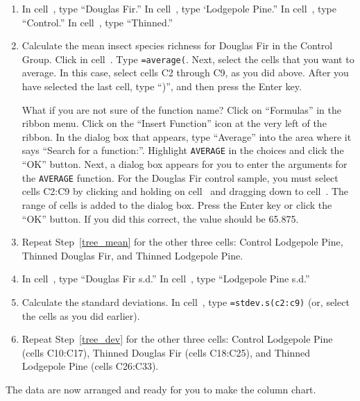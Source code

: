 \documentclass[12pt, hidelinks]{exam}
\newcommand*\xcell[1]{cell~\liningnum{#1}}
\begin{document}
\begin{questions}
\begin{enumerate}
	\item In \xcell{F3}, type “Douglas Fir.” In \xcell{G3}, type ‘Lodgepole Pine.” In \xcell{E4}, type “Control.” In \xcell{E5}, type “Thinned.” 

	\item \label{tree_mean} Calculate the mean insect species richness for Douglas Fir in the Control Group. Click in \xcell{F4}. Type \texttt{=average(}. Next, select the cells that you want to average. In this case, select cells {\liningnum C2} through {\liningnum C9}, as you did above. After you have selected the last cell, type “)”, and then press the Enter key. 

	What if you are not sure of the function name? Click on “Formulas” in the ribbon menu. Click on the “Insert Function” icon at the very left of the ribbon. In the dialog box that appears, type “Average” into the area where it says “Search for a function:”. Highlight \texttt{AVERAGE} in the choices and click the “OK” button. Next, a dialog box appears for you to enter the arguments for the \texttt{AVERAGE} function. For the Douglas Fir control sample, you must select cells C2:C9 by clicking and holding on \xcell{C2} and dragging down to \xcell{C9}. The range of cells is added to the dialog box. Press the Enter key or click the “OK” button. If you did this correct, the value should be 65.875.

	\item Repeat Step~\ref{tree_mean} for the other three cells: Control Lodgepole Pine, Thinned Douglas Fir, and Thinned Lodgepole Pine. 
	
	\item \label{tree_dev} In \xcell{I3}, type ``Douglas Fir s.d.'' In \xcell{J3}, type ``Lodgepole Pine s.d.''
	
	\item Calculate the standard deviations. In \xcell{I4}, type \texttt{=stdev.s(c2:c9)} (or, select the cells as you did earlier).
	
	\item Repeat Step~\ref{tree_dev} for the other three cells: Control Lodgepole Pine (cells {\liningnum C10:C17}), Thinned Douglas Fir (cells {\liningnum C18:C25}), and Thinned Lodgepole Pine (cells {\liningnum C26:C33}). 
	
\end{enumerate}

The data are now arranged and ready for you to make the column chart.


\end{questions}
\end{document}

